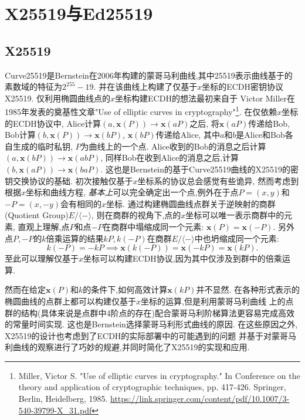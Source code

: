 \section{X25519与Ed25519}

\subsection{X25519}

Curve25519是Bernstein在2006年构建的蒙哥马利曲线,其中25519表示曲线基于的素数域的特征为$2^{255}-19$.
并在该曲线上构建了仅基于$x$坐标的ECDH密钥协议X25519.
仅利用椭圆曲线点的$x$坐标构建ECDH的想法最初来自于
Victor Miller在1985年发表的奠基性文章"Use of elliptic curves in cryptography"\footnote{
Miller, Victor S. "Use of elliptic curves in cryptography." In Conference on the theory and application of cryptographic techniques, pp. 417-426. Springer, Berlin, Heidelberg, 1985.
\url{https://link.springer.com/content/pdf/10.1007/3-540-39799-X_31.pdf}}.
在仅依赖$x$坐标的ECDH协议中, Alice计算$(a, \mathbf{x}(P))\rightarrow\mathbf{x}(aP)$之后,
将$\mathbf{x}(aP)$传递给Bob, Bob计算$(b, \mathbf{x}(P))\rightarrow \mathbf{x}(bP)$, 
$\mathbf{x}(bP)$传递给Alice, 其中$a$和$b$是Alice和Bob各自生成的临时私钥, $P$为曲线上的一个点.
Alice收到的Bob的消息之后计算$(a, \mathbf{x}(bP)) \rightarrow \mathbf{x}(abP)$,
同样Bob在收到Alice的消息之后,计算$(b, \mathbf{x}(aP))\rightarrow \mathbf{x}(baP)$.
这也是Bernstein的基于Curve25519曲线的X25519的密钥交换协议的基础.
初次接触仅基于$x$坐标系的协议总会感觉有些诡异, 然而考虑到根据$x$坐标和曲线方程,
\textit{基本上}可以完全确定出一个点,例外在于点$P=(x,y)$和$-P=(x,-y)$会有相同的$x$坐标.
通过构建椭圆曲线点群关于逆映射的商群(Quotient Group)$E/\langle - \rangle$,
则在商群的视角下,点的$x$坐标可以唯一表示商群中的元素,
直观上理解,点$P$和点$-P$在商群中塌缩成同一个元素: $\mathbf{x}(P)=\mathbf{x}(-P)$.
另外点$P, -P$的$k$倍乘运算的结果$kP, k(-P)$在商群$E/\langle - \rangle$中也坍缩成同一个元素: 
$$k(-P) = -kP \implies \mathbf{x}(k(-P)) = \mathbf{x}(-kP)= \mathbf{x}(kP).$$
至此可以理解仅基于$x$坐标可以构建ECDH协议,因为其中仅涉及到群中的倍乘运算.

然而在给定$\mathbf{x}(P)$和$k$的条件下,如何高效计算$\mathbf{x}(kP)$并不显然.
在各种形式表示的椭圆曲线的点群上都可以构建仅基于$x$坐标的运算,但是利用蒙哥马利曲线
上的点群的结构(具体来说是点群中4阶点的存在)配合蒙哥马利阶梯算法更容易完成高效的常量时间实现.
这也是Bernstein选择蒙哥马利形式曲线的原因.
在这些原因之外, X25519的设计也考虑到了ECDH的实际部署中的可能遇到的问题
并基于对蒙哥马利曲线的观察进行了巧妙的规避,并同时简化了X25519的实现和应用.

